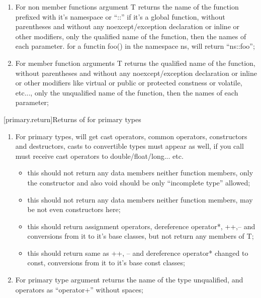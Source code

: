 \begin{enumerate}
\item For non member functions argument T  returns the name of the function prefixed with it's namespace or ``::'' if it's a global function, without parentheses and without any noexcept/exception declaration or inline or other modifiers, only the qualified name of the function, then the names of each parameter. for a functin foo() in the namespace ns,  will return ``ns::foo'';
\item For member function arguments T  returns the qualified name of the function, without parentheses and without any noexcept/exception declaration or inline or other modifiers like virtual or public or protected constness or volatile, etc..., only the unqualified name of the function, then the names of each parameter;
\end{enumerate}

[primary.return]{Returns of  for primary types}
\begin{enumerate}
\item For primary types,  will get cast operators, common operators, constructors and destructors, casts to convertible types must appear as well, if you call  must receive cast operators to double/float/long... etc. 
\begin{itemize}
\item {} this should not return any data members neither function members, only the constructor and also void should be only ``incomplete type'' allowed;
\item {} this should not return any data members neither function members, may be not even constructors here;
\item {} this should return assignment operators, dereference operator*, ++,-- and conversions from it to it's base classes, but not return any members of T;
\item {} this should return same as  ++, -- and dereference operator* changed to const, conversions from it to it's base const classes;
\end{itemize}
\item For primary type argument  returns the name of the type unqualified, and operators as ``operator+'' without spaces;
\end{enumerate}

